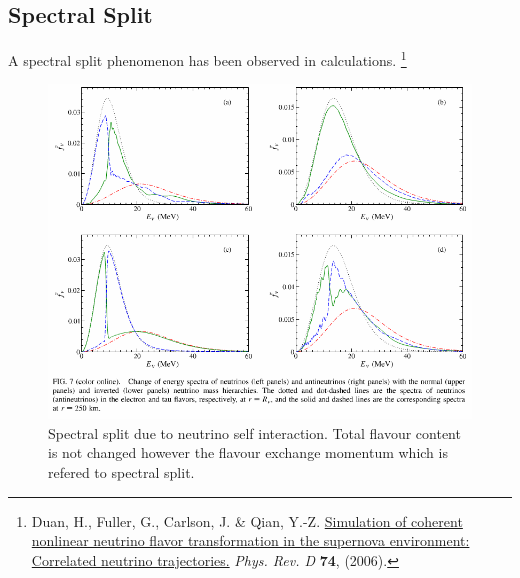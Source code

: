 \documentclass[letterpaper,12pt,english]{sphinxmanual}
\begin{document}
\subsection{Spectral Split}
\label{collective:spectral-split}\label{collective:index-0}
A spectral split phenomenon has been observed in calculations. \footnote{
Duan, H., Fuller, G., Carlson, J. \& Qian, Y.-Z. \href{http://journals.aps.org/prd/abstract/10.1103/PhysRevD.74.105014}{Simulation of coherent nonlinear neutrino flavor transformation in the supernova environment: Correlated neutrino trajectories.} \emph{Phys. Rev. D} \textbf{74}, (2006).
}
\begin{figure}[htbp]
\centering
\capstart

\includegraphics{spectralSplit.png}
\caption{Spectral split due to neutrino self interaction. Total flavour content is not changed however the flavour exchange momentum which is refered to spectral split.}\end{figure}

\end{document}
